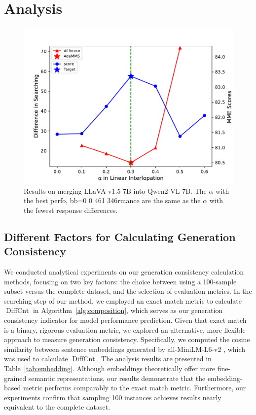 \section{Analysis}
\label{sec:ana}
\begin{figure}
    \centering
    \includegraphics[width=0.4 \textwidth, bb=0 0 461 346]{figure/diff_acc_plot_new.pdf}
    \caption{Results on merging LLaVA-v1.5-7B into Qwen2-VL-7B. The $\alpha$ with the best perfo, bb=0 0 461 346rmance are the same as the $\alpha$ with the fewest response differences.}
    \label{fig:difference}
\end{figure}

\subsection{Different Factors for Calculating Generation Consistency}
We conducted analytical experiments on our generation consistency calculation methods, focusing on two key factors: the choice between using a 100-sample subset versus the complete dataset, and the selection of evaluation metrics. In the searching step of our method, we employed an exact match metric to calculate $\operatorname*{DiffCnt}$ in Algorithm~\ref{alg:composition}, which serves as our generation consistency indicator for model performance prediction. Given that exact match is a binary, rigorous evaluation metric, we explored an alternative, more flexible approach to measure generation consistency. Specifically, we computed the cosine similarity between sentence embeddings generated by all-MiniLM-L6-v2 \cite{sentence-bert}, which was used to calculate $\operatorname*{DiffCnt}$. The analysis results are presented in Table~\ref{tab:embedding}. Although embeddings theoretically offer more fine-grained semantic representations, our results demonstrate that the embedding-based metric performs comparably to the exact match metric. Furthermore, our experiments confirm that sampling 100 instances achieves results nearly equivalent to the complete dataset.


